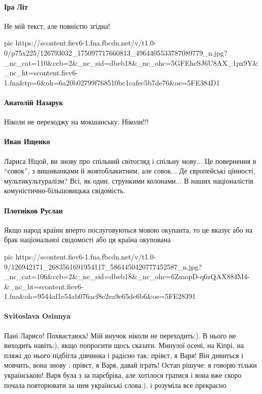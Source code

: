 \paragraph{Іра Літ}

Не мій текст, але повністю згідна!

\ifcmt
pic https://scontent.fiev6-1.fna.fbcdn.net/v/t1.0-0/p75x225/126793032_175097717660813_4964405533787089779_n.jpg?_nc_cat=110&ccb=2&_nc_sid=dbeb18&_nc_ohc=5GFEheSJ6U8AX_1px9Y&_nc_ht=scontent.fiev6-1.fna&tp=6&oh=6a20b02799f768510bc1cafec5b7de76&oe=5FE384D1
\fi

\paragraph{Анатолій Назарук}
Ніколи не переходжу на мокшанську. Ніколи!!!

\paragraph{Иван Ищенко}

Лариса Ніцой, ви знову про спільний світогляд і спільну мову... Це повернення в
\enquote{совок}, з вишиванками й жовтоблакитним, але совок... Де європейські
цінності, мультикультуралізм? Всі, як один, стрункими колонами... В наших
націоналістів комуністично-більшовицька свідомість.

\paragraph{Плотніков Руслан}

Якщо народ країни вперто послуговуються мовою окупанта, то це вказує або на
брак національної свідомості або ця країна окупована

\ifcmt
pic https://scontent.fiev6-1.fna.fbcdn.net/v/t1.0-9/126942171_2683561691954117_5864450420777452587_n.jpg?_nc_cat=106&ccb=2&_nc_sid=dbeb18&_nc_ohc=6ZmopD-q6zQAX884M4-&_nc_ht=scontent.fiev6-1.fna&oh=9544af1e54ab076acf8e2ea9e65de6b6&oe=5FE28391
\fi

\paragraph{Svitoslava Osinnya}

Пані Ларисо! Похвастаюсь! Мій внучок ніколи не переходить:). В нього не
виходить навіть:), якщо попросити щось сказати. Минулої осені, на Кіпрі, на
пляжі до нього підбігла дівчинка і радісно так: прівєт, я Варя! Він дивиться і
мовчить, вона знову : прівєт, я Варя, давай іграть! Остап рішуче: я говорю
тільки українською! Варя була з за парєбріка, але хотілося гратися і вона
вже скоро почала повторювати за ним українські слова:), і розуміла все
прекрасно

